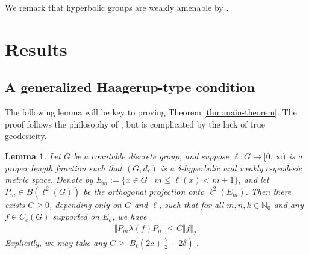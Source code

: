 \documentclass[12pt,a4paper,oneside,final,reqno]{amsart}
\newcommand{\N}{\mathbb{N}}
\theoremstyle{plain}
\newtheorem{lemma}[theorem]{Lemma}
\theoremstyle{definition}
\begin{document}
We remark that hyperbolic groups are weakly amenable by \cite{OzawaHyperbolicWeakAmenable2008}.

\section{Results}\label{sec:results}

\subsection{A generalized Haagerup-type condition}
The following lemma will be key to proving Theorem \ref{thm:main-theorem}. The proof follows the philosophy of \cite[Proposition 4.3]{OzawaRieffel2005}, but is complicated by the lack of true geodesicity.

\begin{lemma}\label{lemma:annular-norm-control}
   Let $G$ be a 
   countable discrete
   group, and suppose $\ell \colon G \to [0,\infty)$ is a proper length function such that $(G,d_\ell)$ is a $\delta$-hyperbolic and weakly $c$-geodesic metric space. 
   Denote by $E_m := \{x \in G \mid m \leq \ell(x) < m+1 \}$, 
   and let 
   $P_m \in B(\ell^2(G))$ be the orthogonal projection onto $\ell^2(E_m)$. 
   Then there exists $C \geq 0$, depending only on $G$ and $\ell$, such that for all $m,n,k \in \N_0$ and any $f \in C_c(G)$ supported on $E_k$, we have
   \begin{align*}
       \Vert P_m \lambda(f) P_n \Vert \leq C \Vert f \Vert_2. 
   \end{align*}
   Explicitly, we may take any $C \geq |B_\ell(2c + \frac{7}{2}+2\delta)\vert$. 
\end{lemma}
\end{document}

